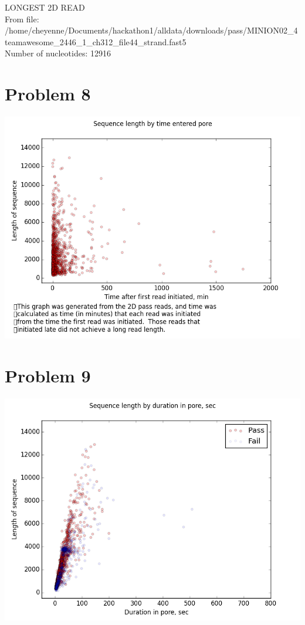 \documentclass[11pt]{article}
\begin{document}
LONGEST 2D READ\\
From file: /home/cheyenne/Documents/hackathon1/alldata/downloads/pass/MINION02\_4teamawesome\_2446\_1\_ch312\_file44\_strand.fast5\\
Number of nucleotides: 12916\\
\section*{Problem 8}
\includegraphics[width=\textwidth]{q8}
\section*{Problem 9}
\includegraphics[width=\textwidth]{q9}
\end{document}
